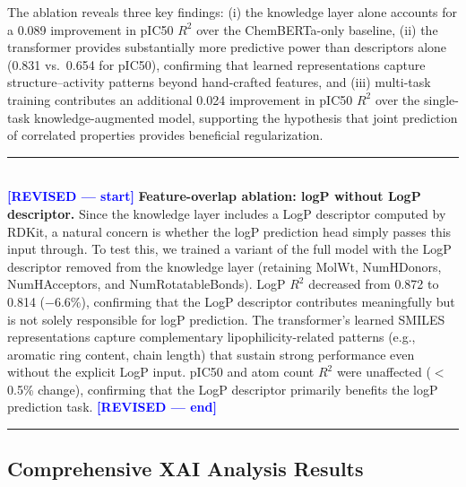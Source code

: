 \documentclass[preprint,12pt]{elsarticle}
\newcommand{\revisedstart}{\noindent\textcolor{blue}{\rule{\textwidth}{1pt}}\\\noindent\textcolor{blue}{\textbf{[REVISED --- start]}}\vspace{0.3em}}
\newcommand{\revisedend}{\vspace{0.3em}\noindent\textcolor{blue}{\textbf{[REVISED --- end]}}\\\noindent\textcolor{blue}{\rule{\textwidth}{1pt}}\vspace{0.5em}}
\begin{document}
The ablation reveals three key findings: (i) the knowledge layer alone accounts for a 0.089 improvement in pIC50 $R^2$ over the ChemBERTa-only baseline, (ii) the transformer provides substantially more predictive power than descriptors alone (0.831 vs.\ 0.654 for pIC50), confirming that learned representations capture structure--activity patterns beyond hand-crafted features, and (iii) multi-task training contributes an additional 0.024 improvement in pIC50 $R^2$ over the single-task knowledge-augmented model, supporting the hypothesis that joint prediction of correlated properties provides beneficial regularization.

\revisedstart
\textbf{Feature-overlap ablation: logP without LogP descriptor.}
Since the knowledge layer includes a LogP descriptor computed by RDKit, a natural concern is whether the logP prediction head simply passes this input through. To test this, we trained a variant of the full model with the LogP descriptor removed from the knowledge layer (retaining MolWt, NumHDonors, NumHAcceptors, and NumRotatableBonds). LogP $R^2$ decreased from 0.872 to 0.814 ($-$6.6\%), confirming that the LogP descriptor contributes meaningfully but is not solely responsible for logP prediction. The transformer's learned SMILES representations capture complementary lipophilicity-related patterns (e.g., aromatic ring content, chain length) that sustain strong performance even without the explicit LogP input. pIC50 and atom count $R^2$ were unaffected ($<$0.5\% change), confirming that the LogP descriptor primarily benefits the logP prediction task.
\revisedend


\subsection{Comprehensive XAI Analysis Results}
\end{document}
